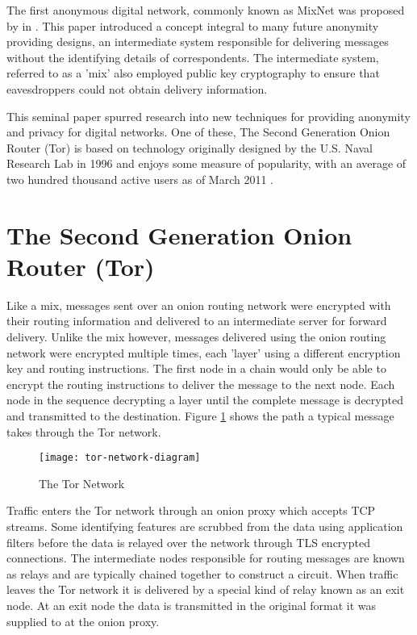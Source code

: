 \documentclass[conference]{IEEEtran}
\begin{document}
The first anonymous digital network, commonly known as MixNet was proposed by
\citeauthor{Chaum:1981p296} in 
\parencite{Chaum:1981p296}. This paper introduced a concept integral to many
future anonymity providing designs, an intermediate system responsible for
delivering messages without the identifying details of correspondents. The
intermediate system, referred to as a 'mix' also employed public key
cryptography to ensure that eavesdroppers could not obtain delivery information.

This seminal paper spurred research into new techniques for providing anonymity
and privacy for digital networks. One of these, The Second Generation Onion
Router (Tor) is based on technology originally designed by the U.S. Naval
Research Lab in 1996 \parencite{Goldschlag:1996wy} and enjoys some measure of
popularity, with an average of two hundred thousand active users as of March
2011 \parencite{The-Tor-Project-Inc.:2011fk}.

\section{The Second Generation Onion Router (Tor)}

Like a mix, messages sent over an onion routing network were encrypted with
their routing information and delivered to an intermediate server for forward
delivery.  Unlike the mix however, messages delivered using the onion routing
network were encrypted multiple times, each 'layer' using a different
encryption key and routing instructions. The first node in a chain would only
be able to encrypt the routing instructions to deliver the message to the next
node. Each node in the sequence decrypting a layer until the complete message
is decrypted and transmitted to the destination. Figure \ref{tor-network} shows
the path a typical message takes through the Tor network.

\begin{figure}[H]
  \centering\texttt{[image: tor-network-diagram]}
  \caption{The Tor Network}
  \label{tor-network}
\end{figure}

Traffic enters the Tor network through an onion proxy which accepts TCP streams.
Some identifying features are scrubbed from the data using application filters
before the data is relayed over the network through TLS \parencite{website:TLS}
encrypted connections. The intermediate nodes responsible for routing messages
are known as relays and are typically chained together to construct a circuit.
When traffic leaves the Tor network it is delivered by a special kind of relay
known as an exit node. At an exit node the data is transmitted in the original
format it was supplied to at the onion proxy.
\end{document}
